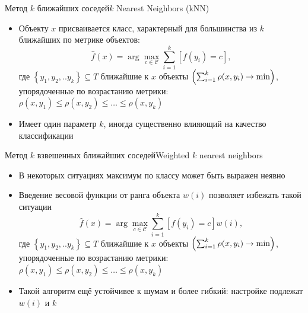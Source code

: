 \documentclass[red,unicode]{beamer}
\begin{document}
\begin{frame}{Метод $k$ ближайших соседей}{$k$ Nearest Neighbors (kNN)}
\begin{itemize}
	\item Объекту $x$ присваивается класс, характерный для большинства из $k$ ближайших по метрике объектов:
	$$
	\hat f(x) = \arg \max_{c\in\mathcal{C}} \sum_{i=1}^{k} [f(y_i) = c], 
	$$
	где $\left\{y_1, y_2, .. y_k\right\} \subseteq T$ ближайшие к $x$ объекты $\Bigl(\sum_{i=1}^{k} \rho(x,y_i) \to \min\Bigr)$, упорядоченные по возрастанию метрики: $\rho(x,y_1) \leqslant \rho(x,y_2) \leqslant \dots \leqslant \rho(x,y_k)$
	\item Имеет один параметр $k$, иногда существенно влияющий на качество классификации
\end{itemize}
\end{frame}

\begin{frame}{Метод $k$ взвешенных ближайших соседей}{Weighted $k$ nearest neighbors}
\begin{itemize}
	\item В некоторых ситуациях максимум по классу может быть выражен неявно
	\item Введение весовой функции от ранга объекта $w(i)$ позволяет избежать такой ситуации
	$$
	\hat f(x) = \arg \max_{c\in\mathcal{C}} \sum_{i=1}^{k} [f(y_i) = c] w(i),
	$$
	где $\left\{y_1, y_2, .. y_k\right\}\subseteq T$ ближайшие к $x$ объекты $\Bigl(\sum_{i=1}^{k} \rho(x,y_i) \to \min\Bigr)$, упорядоченные по возрастанию метрики:  $\rho(x,y_1) \leqslant \rho(x,y_2) \leqslant \dots \leqslant \rho(x,y_k)$
	\item Такой алгоритм ещё устойчивее к шумам и более гибкий: настройке подлежат $w(i)$ и $k$
\end{itemize}
\end{frame}
\end{document}
